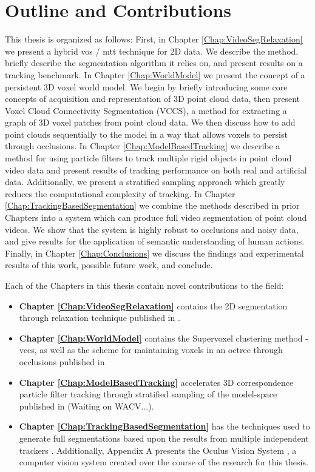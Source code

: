 \section{Outline and Contributions}

This thesis is organized as follows: First, in Chapter \ref{Chap:VideoSegRelaxation} we present a hybrid \gls{vos} / \gls{mtt} technique for 2D data. We describe the method, briefly describe the segmentation algorithm it relies on, and present results on a tracking benchmark. In Chapter \ref{Chap:WorldModel} we present the concept of a persistent 3D voxel world model. We begin by briefly introducing some core concepts of acquisition and representation of 3D point cloud data, then present Voxel Cloud Connectivity Segmentation (VCCS), a method for extracting a graph of 3D voxel patches from point cloud data. We then discuss how to add point clouds sequentially to the model in a way that allows voxels to persist through occlusions. In Chapter \ref{Chap:ModelBasedTracking} we describe a method for using particle filters to track multiple rigid objects in point cloud video data and present results of tracking performance on both real and artificial data. Additionally, we present a stratified sampling approach which greatly reduces the computational complexity of tracking. In Chapter \ref{Chap:TrackingBasedSegmentation} we combine the methods described in prior Chapters into a system which can produce full video segmentation of point cloud videos. We show that the system is highly robust to occlusions and noisy data, and give results for the application of semantic understanding of human actions. Finally, in Chapter \ref{Chap:Conclusions} we discuss the findings and experimental results of this work, possible future work, and conclude.

Each of the Chapters in this thesis contain novel contributions to the field: 
\begin{itemize}
\item {\bf Chapter \ref{Chap:VideoSegRelaxation} } contains the 2D segmentation through relaxation technique published in \cite{PartFilter_Papon_2012}. 

\item {\bf Chapter \ref{Chap:WorldModel} } contains the Supervoxel clustering method - \gls{vccs}, as well as the scheme for maintaining voxels in an octree through occlusions published in \cite{VCCS_Papon_2013}

\item {\bf Chapter \ref{Chap:ModelBasedTracking} } accelerates 3D correspondence particle filter tracking through stratified sampling of the model-space published in (Waiting on WACV...)\cite{??}. 

\item {\bf Chapter \ref{Chap:TrackingBasedSegmentation} } has the techniques used to generate full segmentations based upon the results from multiple independent trackers \cite{PaponIros2013}. Additionally, Appendix A presents the Oculus Vision System \cite{Oculus_Papon_2012}, a computer vision system created over the course of the research for this thesis.
\end{itemize}